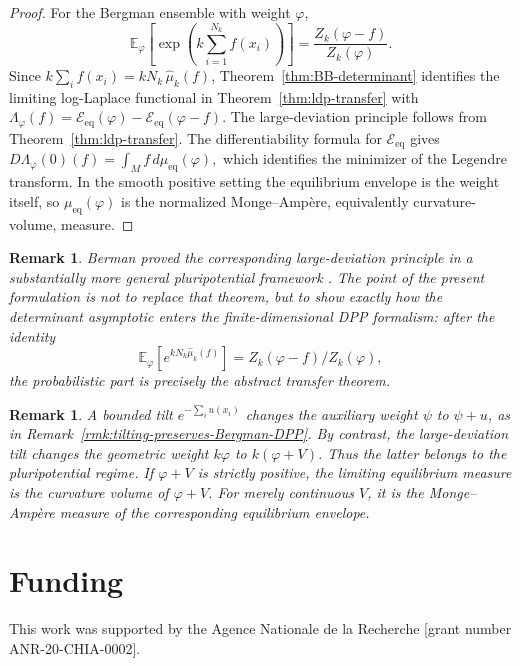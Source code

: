\documentclass[12pt,a4paper,reqno]{article}
\theoremstyle{thmstyleone}
\theoremstyle{thmstylethree}
\theoremstyle{thmstyletwo}
\newtheorem{remark}[theorem]{Remark}
\numberwithin{equation}{subsection}
\begin{document}
\begin{proof}
For the Bergman ensemble with weight $\varphi$,
\[
    \mathbb E_\varphi
    \left[
        \exp\left(k\sum_{i=1}^{N_k}f(x_i)\right)
    \right]
    =
    \frac{Z_k(\varphi-f)}{Z_k(\varphi)}.
\]
Since $k\sum_i f(x_i)=kN_k\,\widehat\mu_k(f)$, Theorem~\ref{thm:BB-determinant} identifies the limiting log-Laplace functional in Theorem~\ref{thm:ldp-transfer} with $\Lambda_\varphi(f)=\mathcal E_{\mathrm{eq}}(\varphi)-\mathcal E_{\mathrm{eq}}(\varphi-f).$ The large-deviation principle follows from Theorem~\ref{thm:ldp-transfer}. The differentiability formula for $\mathcal E_{\mathrm{eq}}$ gives $D\Lambda_\varphi(0)(f)=\int_M f\,d\mu_{\mathrm{eq}}(\varphi),$ which identifies the minimizer of the Legendre transform. In the smooth positive setting the equilibrium envelope is the weight itself, so $\mu_{\mathrm{eq}}(\varphi)$ is the normalized Monge--Amp\`ere, equivalently curvature-volume, measure.
\end{proof}

\begin{remark}
Berman proved the corresponding large-deviation principle in a substantially more general pluripotential framework \cite{Ber6}. The point of the present formulation is not to replace that theorem, but to show exactly how the determinant asymptotic enters the finite-dimensional DPP formalism: after the identity
\[
    \mathbb E_\varphi\left[e^{kN_k\widehat\mu_k(f)}\right]
    =
    Z_k(\varphi-f)/Z_k(\varphi),
\]
the probabilistic part is precisely the abstract transfer theorem.
\end{remark}

\begin{remark}
A bounded tilt $e^{-\sum_i u(x_i)}$ changes the auxiliary weight $\psi$ to $\psi+u$, as in Remark~\ref{rmk:tilting-preserves-Bergman-DPP}. By contrast, the large-deviation tilt changes the geometric weight $k\varphi$ to $k(\varphi+V)$. Thus the latter belongs to the pluripotential regime. If $\varphi+V$ is strictly positive, the limiting equilibrium measure is the curvature volume of $\varphi+V$. For merely continuous $V$, it is the Monge--Amp\`ere measure of the corresponding equilibrium envelope.
\end{remark}

\section*{Funding}

This work was supported by the Agence Nationale de la Recherche
[grant number ANR-20-CHIA-0002].
\end{document}
